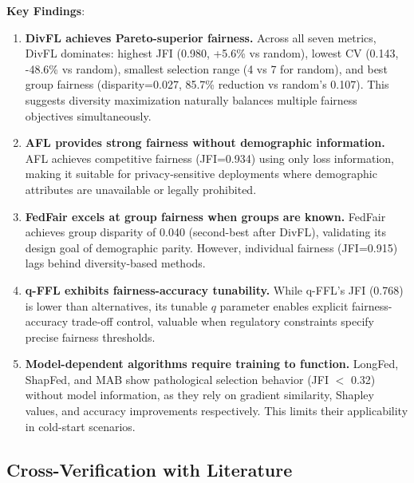 \documentclass{article}
\begin{document}
\textbf{Key Findings}:
\begin{enumerate}
\item \textbf{DivFL achieves Pareto-superior fairness.} Across all seven metrics, DivFL dominates: highest JFI (0.980, +5.6\% vs random), lowest CV (0.143, -48.6\% vs random), smallest selection range (4 vs 7 for random), and best group fairness (disparity=0.027, 85.7\% reduction vs random's 0.107). This suggests diversity maximization naturally balances multiple fairness objectives simultaneously.

\item \textbf{AFL provides strong fairness without demographic information.} AFL achieves competitive fairness (JFI=0.934) using only loss information, making it suitable for privacy-sensitive deployments where demographic attributes are unavailable or legally prohibited.

\item \textbf{FedFair excels at group fairness when groups are known.} FedFair achieves group disparity of 0.040 (second-best after DivFL), validating its design goal of demographic parity. However, individual fairness (JFI=0.915) lags behind diversity-based methods.

\item \textbf{q-FFL exhibits fairness-accuracy tunability.} While q-FFL's JFI (0.768) is lower than alternatives, its tunable $q$ parameter enables explicit fairness-accuracy trade-off control, valuable when regulatory constraints specify precise fairness thresholds.

\item \textbf{Model-dependent algorithms require training to function.} LongFed, ShapFed, and MAB show pathological selection behavior (JFI $<$ 0.32) without model information, as they rely on gradient similarity, Shapley values, and accuracy improvements respectively. This limits their applicability in cold-start scenarios.
\end{enumerate}

\subsection{Cross-Verification with Literature}
\end{document}
